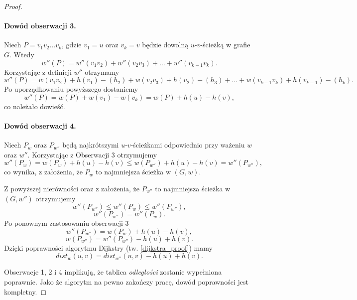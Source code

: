 \begin{theorem}
\begin{proof}
		\paragraph{Dowód obserwacji 3.} Niech $P=v_1v_2\dots v_k$, 
		gdzie $v_1 = u$ oraz $v_k = v$ będzie dowolną $u$-$v$-ścieżką
		w grafie $G$. Wtedy 
		\[w''(P) = w''(v_1v_2) + w''(v_2v_3) + \dots + w''(v_{k-1}v_k).\]
		Korzystając z definicji $w''$ otrzymamy
		\[w''(P) = w(v_1v_2) + h(v_1) - (h_2) + 
		w(v_2v_3) + h(v_2) - (h_3) + 
		\dots + w(v_{k-1}v_k) + h(v_{k-1}) - (h_k).\]
		Po uporządkowaniu powyższego dostaniemy
		\[w''(P) = w(P) + w(v_1) - w(v_k) = w(P) + h(u) - h(v),\]
		co należało dowieść.
		
		\paragraph{Dowód obserwacji 4.} Niech $P_{w}$ oraz 
		$P_{w''}$ będą najkrótszymi $u$-$v$-ścieżkami odpowiednio 
		przy ważeniu $w$ oraz $w''$. Korzystając z 
		Obserwacji 3 otrzymujemy
		\[w''(P_{w}) = w(P_{w}) + h(u) - h(v) \leq
		w(P_{w''}) + h(u) - h(v) = w''(P_{w''}),\]
		co wynika, z założenia, że $P_{w}$ to 
		najmniejsza ścieżka w $(G, w)$. 
		
		Z powyższej nierówności oraz z założenia, że $P_{w''}$ to 
		najmniejsza ścieżka w $(G, w'')$ otrzymujemy
		\[w''(P_{w''}) \leq w''(P_{w}) \leq w''(P_{w''}), \]
		\[w''(P_{w''}) = w''(P_{w}).\]
		Po ponownym zastosowaniu obserwacji 3
		\[w''(P_{w''}) = w(P_{w}) + h(u) - h(v),\]
		\[w(P_{w''}) = w''(P_{w''}) - h(u) + h(v).\]
		Dzięki poprawności algorytmu Dijkstry (tw. \ref{dijkstra_proof})
		mamy
		\[dist_{w}(u, v) = dist_{w''}(u, v) - h(u) + h(v).\]
		
		Obserwacje 1, 2 i 4 implikują, że tablica \textit{odległości} zostanie
		wypełniona poprawnie. Jako że algorytm na pewno zakończy pracę,
		dowód poprawności jest kompletny.
	\end{proof} 
\end{theorem}

